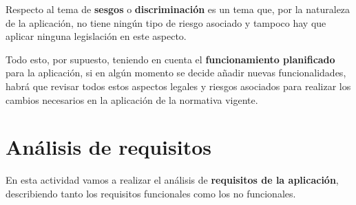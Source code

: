 Respecto al tema de \textbf{sesgos} o \textbf{discriminación} es un tema que, por la naturaleza de la aplicación, no tiene ningún tipo de riesgo asociado y tampoco hay que aplicar ninguna legislación en este aspecto.

Todo esto, por supuesto, teniendo en cuenta el \textbf{funcionamiento planificado} para la aplicación, si en algún momento se decide añadir nuevas funcionalidades, habrá que revisar todos estos aspectos legales y riesgos asociados para realizar los cambios necesarios en la aplicación de la normativa vigente.

\section{Análisis de requisitos}
En esta actividad vamos a realizar el análisis de \textbf{requisitos de la aplicación}, describiendo tanto los requisitos funcionales como los no funcionales.

